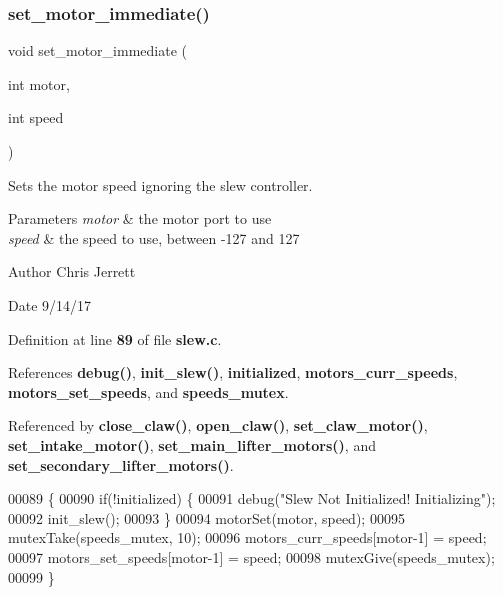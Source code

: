 \subsubsection{set\+\_\+motor\+\_\+immediate()}
{\footnotesize\ttfamily void set\+\_\+motor\+\_\+immediate (\begin{DoxyParamCaption}\item[{int}]{motor,  }\item[{int}]{speed }\end{DoxyParamCaption})}



Sets the motor speed ignoring the slew controller. 


\begin{DoxyParams}{Parameters}
{\em motor} & the motor port to use \\
\hline
{\em speed} & the speed to use, between -\/127 and 127 \\
\hline
\end{DoxyParams}
\begin{DoxyAuthor}{Author}
Chris Jerrett 
\end{DoxyAuthor}
\begin{DoxyDate}{Date}
9/14/17 
\end{DoxyDate}


Definition at line \textbf{ 89} of file \textbf{ slew.\+c}.



References \textbf{ debug()}, \textbf{ init\+\_\+slew()}, \textbf{ initialized}, \textbf{ motors\+\_\+curr\+\_\+speeds}, \textbf{ motors\+\_\+set\+\_\+speeds}, and \textbf{ speeds\+\_\+mutex}.



Referenced by \textbf{ close\+\_\+claw()}, \textbf{ open\+\_\+claw()}, \textbf{ set\+\_\+claw\+\_\+motor()}, \textbf{ set\+\_\+intake\+\_\+motor()}, \textbf{ set\+\_\+main\+\_\+lifter\+\_\+motors()}, and \textbf{ set\+\_\+secondary\+\_\+lifter\+\_\+motors()}.


\begin{DoxyCode}
00089                                                \{
00090   \textcolor{keywordflow}{if}(!initialized) \{
00091     debug(\textcolor{stringliteral}{"Slew Not Initialized! Initializing"});
00092     init_slew();
00093   \}
00094   motorSet(motor, speed);
00095   mutexTake(speeds_mutex, 10);
00096   motors_curr_speeds[motor-1] = speed;
00097   motors_set_speeds[motor-1] = speed;
00098   mutexGive(speeds_mutex);
00099 \}
\end{DoxyCode}
\mbox{\label{slew_8h_a7dff2b79dffe55fb936d977594d7c01d}} 
